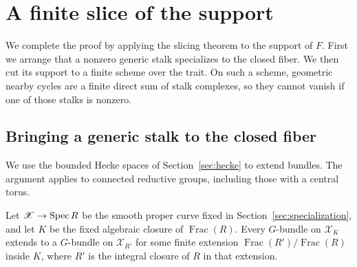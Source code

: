 \section{A finite slice of the support}
\label{sec:support}

We complete the proof by applying the slicing theorem to the support of
$F$.  First we arrange that a nonzero generic stalk specializes to the
closed fiber.  We then cut its support to a finite scheme over the trait.
On such a scheme, geometric nearby cycles are a finite direct sum of stalk
complexes, so they cannot vanish if one of those stalks is nonzero.

\subsection{Bringing a generic stalk to the closed fiber}

We use the bounded Hecke spaces of Section~\ref{sec:hecke} to extend
bundles.  The argument applies to connected reductive groups, including
those with a central torus.

\begin{lemma}
\label{support:extension}
Let $\mathscr X\to\operatorname{Spec} R$ be the smooth proper curve fixed in
Section~\ref{sec:specialization}, and let $K$ be the fixed algebraic
closure of $\operatorname{Frac}(R)$.  Every $G$-bundle on $\mathscr X_K$
extends to a $G$-bundle on $\mathscr X_{R'}$ for some finite extension
$\operatorname{Frac}(R')/\operatorname{Frac}(R)$ inside $K$, where $R'$
is the integral closure of $R$ in that extension.
\end{lemma}

